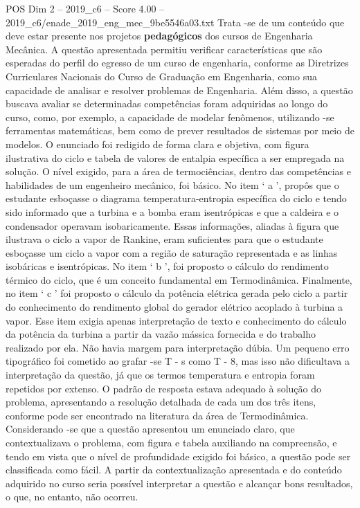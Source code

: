 \begin{textsample}{POS Dim 2 – 2019\_c6 – Score 4.00 – 2019\_c6/enade\_2019\_eng\_mec\_9be5546a03.txt}
Trata -se de um conteúdo que deve estar presente nos projetos \textbf{pedagógicos} dos cursos de Engenharia Mecânica.
A questão apresentada permitiu verificar características que são esperadas do perfil do egresso de um curso de engenharia, conforme as Diretrizes Curriculares Nacionais do Curso de Graduação em Engenharia, como sua capacidade de analisar e resolver problemas de Engenharia.
Além disso, a questão buscava avaliar se determinadas competências foram adquiridas ao longo do curso, como, por exemplo, a capacidade de modelar fenômenos, utilizando -se ferramentas matemáticas, bem como de prever resultados de sistemas por meio de modelos.
O enunciado foi redigido de forma clara e objetiva, com figura ilustrativa do ciclo e tabela de valores de entalpia específica a ser empregada na solução.
O nível exigido, para a área de termociências, dentro das competências e habilidades de um engenheiro mecânico, foi básico.
No item ‘ a ’, propôs que o estudante esboçasse o diagrama temperatura-entropia específica do ciclo e tendo sido informado que a turbina e a bomba eram isentrópicas e que a caldeira e o condensador operavam isobaricamente.
Essas informações, aliadas à figura que ilustrava o ciclo a vapor de Rankine, eram suficientes para que o estudante esboçasse um ciclo a vapor com a região de saturação representada e as linhas isobáricas e isentrópicas.
No item ‘ b ’, foi proposto o cálculo do rendimento térmico do ciclo, que é um conceito fundamental em Termodinâmica.
Finalmente, no item ‘ c ’ foi proposto o cálculo da potência elétrica gerada pelo ciclo a partir do conhecimento do rendimento global do gerador elétrico acoplado à turbina a vapor.
Esse item exigia apenas interpretação de texto e conhecimento do cálculo da potência da turbina a partir da vazão mássica fornecida e do trabalho realizado por ela.
Não havia margem para interpretação dúbia.
Um pequeno erro tipográfico foi cometido ao grafar -se T - s como T - 8, mas isso não dificultava a interpretação da questão, já que os termos temperatura e entropia foram repetidos por extenso.
O padrão de resposta estava adequado à solução do problema, apresentando a resolução detalhada de cada um dos três itens, conforme pode ser encontrado na literatura da área de Termodinâmica.
Considerando -se que a questão apresentou um enunciado claro, que contextualizava o problema, com figura e tabela auxiliando na compreensão, e tendo em vista que o nível de profundidade exigido foi básico, a questão pode ser classificada como fácil.
A partir da contextualização apresentada e do conteúdo adquirido no curso seria possível interpretar a questão e alcançar bons resultados, o que, no entanto, não ocorreu.

\end{textsample}
